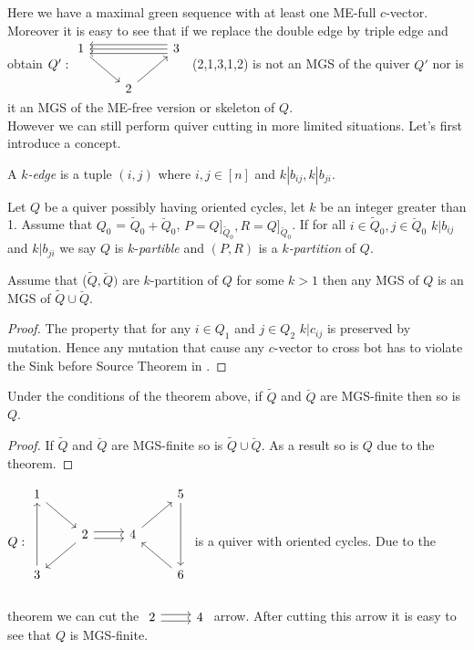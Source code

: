 \indent Here we have a maximal green sequence with at least one ME-full $c$-vector. Moreover it is easy to see that if we replace the double edge by triple edge and obtain $Q': \begin{tikzcd}
1\arrow[rd] &  & 3\lefttwicetriplearrow\\
 & 2\arrow[ur]
\end{tikzcd}$\ (2,1,3,1,2) is not an MGS of the quiver $Q'$ nor is it an MGS of the ME-free version or skeleton of $Q$.\\
\indent However we can still perform quiver cutting in more limited situations. Let's first introduce a concept.
\begin{definition}
A $k$\textit{-edge} is a tuple $(i,j)$ where $i,j\in [n]$ and $k|b_{ij}, k|b_{ji}$.
\end{definition}
\begin{definition}
Let $Q$ be a quiver possibly having oriented cycles, let $k$ be an integer greater than 1. Assume that $Q_0$ = $\tilde{Q}_0 + \breve{Q}_0$, $P = Q]_{\tilde{Q}_0}, R = Q]_{\breve{Q}_0}$. If for all $i\in \tilde{Q}_0, j\in  \breve{Q}_0$ $k|b_{ij}$ and $k|b_{ji}$ we say $Q$ is $k$-\textit{partible} and $(P, R)$ is a $k$\textit{-partition} of $Q$.
\end{definition}
\begin{theorem}
Assume that ($\tilde{Q},\breve{Q})$ are $k$-partition of $Q$ for some $k>1$ then any MGS of $Q$ is an MGS of $\tilde{Q}\cup\breve{Q}$.\label{C4T2B}
\end{theorem}
\begin{proof}
The property that for any $i\in Q_1$ and $j\in Q_2$ $k|c_{ij}$ is preserved by mutation. Hence any mutation that cause any $c$-vector to cross bot has to violate the Sink before Source Theorem in \cite{BHIT15}.
\end{proof}
\begin{corollary}
Under the conditions of the theorem above, if $\tilde{Q}$ and $\breve{Q}$ are MGS-finite then so is $Q$.
\end{corollary}
\begin{proof}
If $\tilde{Q}$ and $\breve{Q}$ are MGS-finite so is $\tilde{Q}\cup\breve{Q}$. As a result so is $Q$ due to the theorem.
\end{proof}
\begin{example}
$Q:\begin{tikzcd}
1\arrow[rd] &                                             &                   &5\arrow[dd]\\
                 &2\arrow[dl]\rightdoublearrow & 4\arrow[ur] &\\
3\arrow[uu] &                                            &                  &6\arrow[ul]\\
\end{tikzcd}$ is a quiver with oriented cycles. Due to the theorem we can cut the $\begin{tikzcd}2\rightdoublearrow & 4\end{tikzcd}$ arrow. After cutting this arrow it is easy to see that $Q$ is MGS-finite.
\end{example}
